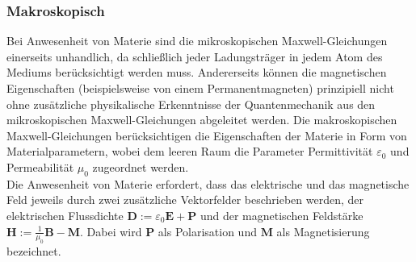 			\subsubsection{Makroskopisch}
				Bei Anwesenheit von Materie sind die mikroskopischen Maxwell-Gleichungen einerseits unhandlich, da schließlich jeder Ladungsträger in jedem Atom des Mediums berücksichtigt werden muss. Andererseits können die magnetischen Eigenschaften (beispielsweise von einem Permanentmagneten) prinzipiell nicht ohne zusätzliche physikalische Erkenntnisse der Quantenmechanik aus den mikroskopischen Maxwell-Gleichungen abgeleitet werden. Die makroskopischen Maxwell-Gleichungen berücksichtigen die Eigenschaften der Materie in Form von Materialparametern, wobei dem leeren Raum die Parameter Permittivität $ \varepsilon_{0} $ und Permeabilität $ \mu_{0} $ zugeordnet werden. \\
				Die Anwesenheit von Materie erfordert, dass das elektrische und das magnetische Feld jeweils durch zwei zusätzliche Vektorfelder beschrieben werden, der elektrischen Flussdichte $ \bm{D} := \varepsilon_{0}\bm{E} + \bm{P} $ und der magnetischen Feldstärke $ \bm{H} := \frac{1}{\mu_{0}}\bm{B} - \bm{M} $. Dabei wird $ \bm{P} $ als Polarisation und $ \bm{M} $ als Magnetisierung bezeichnet.
